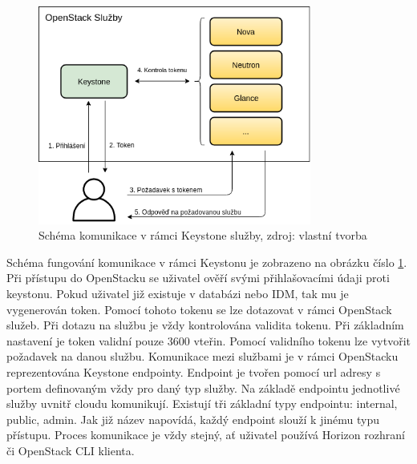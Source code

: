 \begin{figure}[H]
\begin{centering}
\includegraphics[width=0.8\textwidth]{img/keystone_schema.png}
\par\end{centering}
\caption{Schéma komunikace v rámci Keystone služby, zdroj: vlastní tvorba} \label{fig:keystone_schema}
\end{figure}

Schéma fungování komunikace v rámci Keystonu je zobrazeno na obrázku číslo \ref{fig:keystone_schema}. Při přístupu do OpenStacku se uživatel ověří svými přihlašovacími údaji proti keystonu. Pokud uživatel již existuje v databázi nebo IDM, tak mu je vygenerován token. Pomocí tohoto tokenu se lze dotazovat v rámci OpenStack služeb. Při dotazu na službu je vždy kontrolována validita tokenu. Při základním nastavení je token validní pouze 3600 vteřin. Pomocí validního tokenu lze vytvořit požadavek na danou službu. Komunikace mezi službami je v rámci OpenStacku reprezentována Keystone endpointy. Endpoint je tvořen pomocí url adresy s portem definovaným vždy pro daný typ služby. Na základě endpointu jednotlivé služby uvnitř cloudu komunikují. Existují tři základní typy endpointu: internal, public, admin. Jak již název napovídá, každý endpoint slouží k jinému typu přístupu. Proces komunikace je vždy stejný, ať uživatel používá Horizon rozhraní či OpenStack CLI klienta.

